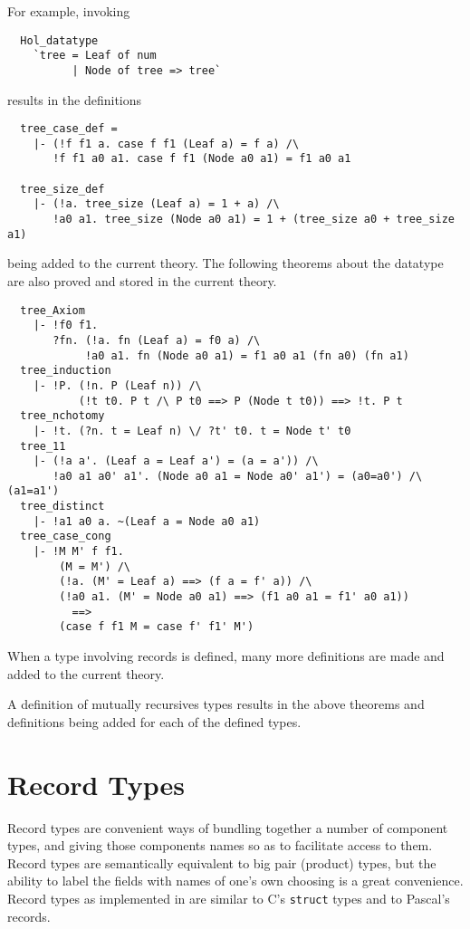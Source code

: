 For example, invoking
%
\begin{hol}
\begin{verbatim}
  Hol_datatype 
    `tree = Leaf of num
          | Node of tree => tree`
\end{verbatim}
\end{hol}
%
results in the definitions
%
\begin{hol}
\begin{verbatim}
  tree_case_def =
    |- (!f f1 a. case f f1 (Leaf a) = f a) /\
       !f f1 a0 a1. case f f1 (Node a0 a1) = f1 a0 a1

  tree_size_def
    |- (!a. tree_size (Leaf a) = 1 + a) /\
       !a0 a1. tree_size (Node a0 a1) = 1 + (tree_size a0 + tree_size a1)
\end{verbatim}
\end{hol}
%
being added to the current theory. The following theorems about the datatype
are also proved and stored in the current theory.
%
\begin{hol}
\begin{verbatim}
  tree_Axiom
    |- !f0 f1.
       ?fn. (!a. fn (Leaf a) = f0 a) /\
            !a0 a1. fn (Node a0 a1) = f1 a0 a1 (fn a0) (fn a1)
  tree_induction
    |- !P. (!n. P (Leaf n)) /\
           (!t t0. P t /\ P t0 ==> P (Node t t0)) ==> !t. P t
  tree_nchotomy  
    |- !t. (?n. t = Leaf n) \/ ?t' t0. t = Node t' t0
  tree_11
    |- (!a a'. (Leaf a = Leaf a') = (a = a')) /\
       !a0 a1 a0' a1'. (Node a0 a1 = Node a0' a1') = (a0=a0') /\ (a1=a1')
  tree_distinct  
    |- !a1 a0 a. ~(Leaf a = Node a0 a1)
  tree_case_cong
    |- !M M' f f1.
        (M = M') /\
        (!a. (M' = Leaf a) ==> (f a = f' a)) /\
        (!a0 a1. (M' = Node a0 a1) ==> (f1 a0 a1 = f1' a0 a1))
          ==>
        (case f f1 M = case f' f1' M')
\end{verbatim}
\end{hol}
%
When a type involving records is defined, many more definitions are
made and added to the current theory.

A definition of mutually recursives types results in the above theorems and
definitions being added for each of the defined types.

\section{Record Types}

Record types are convenient ways of bundling together a number of
component types, and giving those components names so as to facilitate
access to them.  Record types are semantically equivalent to big pair
(product) types, but the ability to label the fields with names of
one's own choosing is a great convenience.  Record types as
implemented in \HOL{} are similar to C's \texttt{struct} types and to
Pascal's records.

